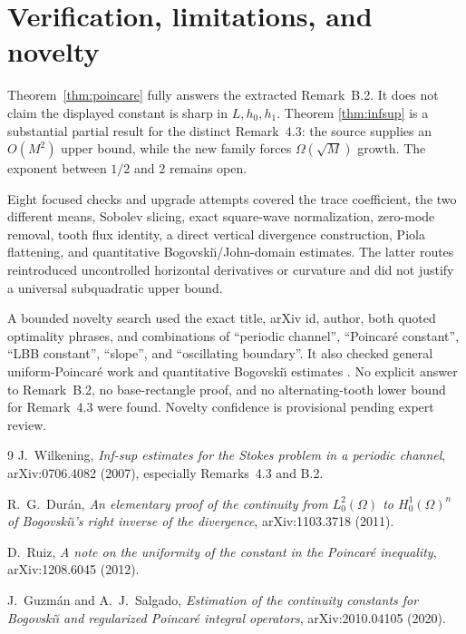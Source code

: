 \documentclass[11pt]{article}
\begin{document}
\section{Verification, limitations, and novelty}

Theorem~\ref{thm:poincare} fully answers the extracted Remark~B.2.  It
does not claim the displayed constant is sharp in \(L,h_0,h_1\).  Theorem
\ref{thm:infsup} is a substantial partial result for the distinct Remark~4.3:
the source supplies an \(O(M^2)\) upper bound, while the new family forces
\(\Omega(\sqrt M)\) growth.  The exponent between \(1/2\) and \(2\)
remains open.

Eight focused checks and upgrade attempts covered the trace coefficient, the
two different means, Sobolev slicing, exact square-wave normalization,
zero-mode removal, tooth flux identity, a direct vertical divergence
construction, Piola flattening, and quantitative Bogovski\u\i{}/John-domain
estimates.  The latter routes reintroduced uncontrolled horizontal
derivatives or curvature and did not justify a universal subquadratic upper
bound.

A bounded novelty search used the exact title, arXiv id, author, both quoted
optimality phrases, and combinations of ``periodic channel'', ``Poincar\'e
constant'', ``LBB constant'', ``slope'', and ``oscillating boundary''.  It
also checked general uniform-Poincar\'e work \cite{Ruiz} and quantitative
Bogovski\u\i{} estimates \cite{Duran,GuzmanSalgado}.  No explicit answer to
Remark~B.2, no base-rectangle proof, and no alternating-tooth lower bound for
Remark~4.3 were found.  Novelty confidence is provisional pending expert
review.

\begin{thebibliography}{9}
J.~Wilkening,
\emph{Inf-sup estimates for the Stokes problem in a periodic channel},
arXiv:0706.4082 (2007), especially Remarks~4.3 and B.2.

R.~G.~Dur\'an,
\emph{An elementary proof of the continuity from $L^2_0(\Omega)$ to
$H^1_0(\Omega)^n$ of Bogovski\u\i{}'s right inverse of the divergence},
arXiv:1103.3718 (2011).

D.~Ruiz,
\emph{A note on the uniformity of the constant in the Poincar\'e
inequality}, arXiv:1208.6045 (2012).

J.~Guzm\'an and A.~J.~Salgado,
\emph{Estimation of the continuity constants for Bogovski\u\i{} and
regularized Poincar\'e integral operators}, arXiv:2010.04105 (2020).
\end{thebibliography}
\end{document}
